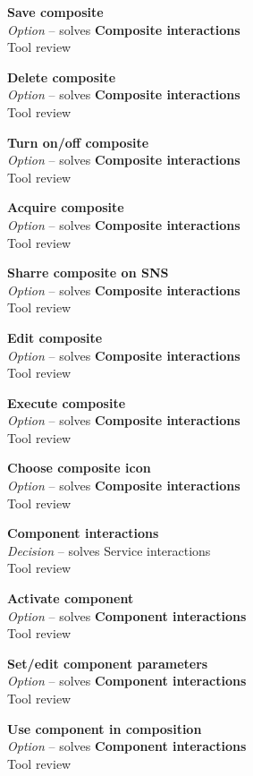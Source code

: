 \textbf{Save composite} \\ \emph{Option} -- solves \textbf{Composite interactions} \\ Tool review

\textbf{Delete composite} \\ \emph{Option} -- solves \textbf{Composite interactions} \\ Tool review

\textbf{Turn on/off composite} \\ \emph{Option} -- solves \textbf{Composite interactions} \\ Tool review

\textbf{Acquire composite} \\ \emph{Option} -- solves \textbf{Composite interactions} \\ Tool review

\textbf{Sharre composite on SNS} \\ \emph{Option} -- solves \textbf{Composite interactions} \\ Tool review

\textbf{Edit composite} \\ \emph{Option} -- solves \textbf{Composite interactions} \\ Tool review

\textbf{Execute composite} \\ \emph{Option} -- solves \textbf{Composite interactions} \\ Tool review

\textbf{Choose composite icon} \\ \emph{Option} -- solves \textbf{Composite interactions} \\ Tool review

\textbf{Component interactions} \\ \emph{Decision} -- solves {Service interactions} \\ Tool review

\textbf{Activate component} \\ \emph{Option} -- solves \textbf{Component interactions} \\ Tool review

\textbf{Set/edit component parameters} \\ \emph{Option} -- solves \textbf{Component interactions} \\ Tool review

\textbf{Use component in composition} \\ \emph{Option} -- solves \textbf{Component interactions} \\ Tool review

